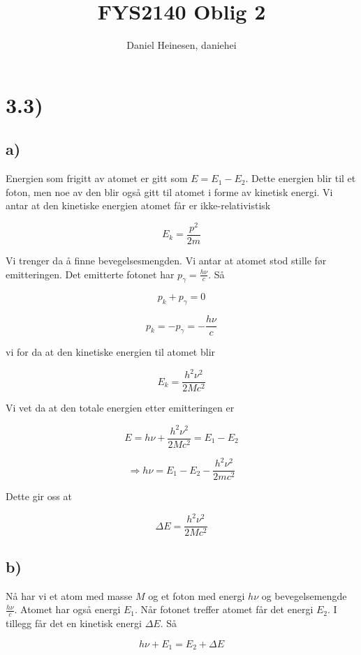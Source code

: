 \documentclass[a4paper,norsk, 10pt]{article}
\title{FYS2140 Oblig 2}
\author{Daniel Heinesen, daniehei}
\begin{document}
\maketitle

\section*{3.3)}

\subsection*{a)}

Energien som frigitt av atomet er gitt som $E = E_1-E_2$. Dette energien blir til et foton, men noe av den blir også gitt til atomet i forme av kinetisk energi. Vi antar at den kinetiske energien atomet får er ikke-relativistisk

$$
E_k = \frac{p^2}{2m}
$$ 

Vi trenger da å finne bevegelsesmengden. Vi antar at atomet stod stille før emitteringen. Det emitterte fotonet har $p_{\gamma} = \frac{h\nu}{c}$. Så

$$
p_k + p_{\gamma} = 0
$$

$$
p_k = -p_{\gamma} = -\frac{h\nu}{c}
$$

vi for da at den kinetiske energien til atomet blir

$$
E_k = \frac{h^2\nu^2}{2Mc^2}
$$

Vi vet da at den totale energien etter emitteringen er

$$
E = h\nu + \frac{h^2\nu^2}{2Mc^2} = E_1 - E_2
$$

$$
\Rightarrow h\nu = E_1 - E_2 - \frac{h^2\nu^2}{2mc^2}
$$

Dette gir oss at 

\begin{equation}
\Delta E = \frac{h^2\nu^2}{2Mc^2}
\label{eq:dE}
\end{equation}

\subsection*{b)}

Nå har vi et atom med masse $M$ og et foton med energi $h\nu$ og bevegelsemengde $\frac{h\nu}{c}$. Atomet har også energi $E_1$. Når fotonet treffer atomet får det energi $E_2$. I tillegg får det en kinetisk energi $\Delta E$. Så

$$
h\nu + E_1 = E_2 +\Delta E
$$
\end{document}
